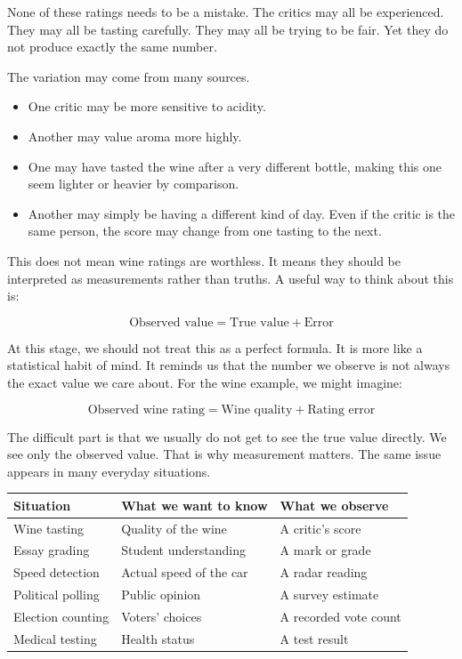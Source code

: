 \documentclass[
  letterpaper,
  DIV=11,
  numbers=noendperiod]{scrreprt}
\providecommand{\tightlist}{%
  \setlength{\itemsep}{0pt}\setlength{\parskip}{0pt}}
\begin{document}
None of these ratings needs to be a mistake. The critics may all be
experienced. They may all be tasting carefully. They may all be trying
to be fair. Yet they do not produce exactly the same number.

The variation may come from many sources.

\begin{itemize}
\tightlist
\item
  One critic may be more sensitive to acidity.
\item
  Another may value aroma more highly.
\item
  One may have tasted the wine after a very different bottle, making
  this one seem lighter or heavier by comparison.
\item
  Another may simply be having a different kind of day. Even if the
  critic is the same person, the score may change from one tasting to
  the next.
\end{itemize}

This does not mean wine ratings are worthless. It means they should be
interpreted as measurements rather than truths. A useful way to think
about this is:

\[
\text{Observed value} = \text{True value} + \text{Error}
\]

At this stage, we should not treat this as a perfect formula. It is more
like a statistical habit of mind. It reminds us that the number we
observe is not always the exact value we care about. For the wine
example, we might imagine:

\[
\text{Observed wine rating} = \text{Wine quality} + \text{Rating error}
\]

The difficult part is that we usually do not get to see the true value
directly. We see only the observed value. That is why measurement
matters. The same issue appears in many everyday situations.

\begin{table}
\fontsize{12.0pt}{14.0pt}\selectfont
\begin{tabular*}{\linewidth}{@{\extracolsep{\fill}}lll}
\toprule
Situation & What we want to know & What we observe \\ 
\midrule\addlinespace[2.5pt]
Wine tasting & Quality of the wine & A critic's score \\ 
Essay grading & Student understanding & A mark or grade \\ 
Speed detection & Actual speed of the car & A radar reading \\ 
Political polling & Public opinion & A survey estimate \\ 
Election counting & Voters' choices & A recorded vote count \\ 
Medical testing & Health status & A test result \\ 
\bottomrule
\end{tabular*}
\end{table}
\end{document}
